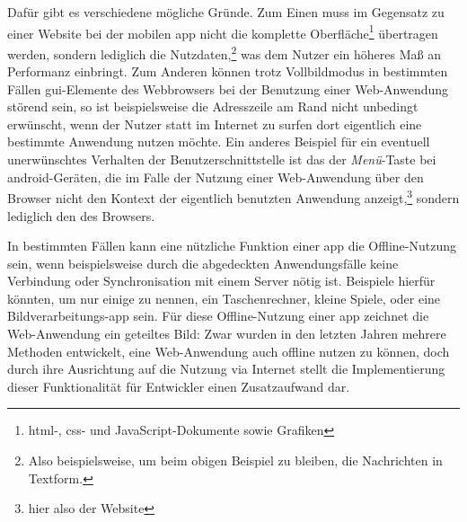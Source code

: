 Dafür gibt es verschiedene mögliche Gründe. Zum Einen muss im Gegensatz zu einer Website bei der mobilen \gls{app} nicht die komplette Oberfläche\footnote{\gls{html}-, \gls{css}- und JavaScript-Dokumente sowie Grafiken} übertragen werden, sondern lediglich die Nutzdaten,\footnote{Also beispielsweise, um beim obigen Beispiel zu bleiben, die Nachrichten in Textform.} was dem Nutzer ein höheres Maß an Performanz einbringt.
Zum Anderen können trotz Vollbildmodus in bestimmten Fällen \gls{gui}-Elemente des Webbrowsers bei der Benutzung einer Web-Anwendung störend sein, so ist beispielsweise die Adresszeile am Rand nicht unbedingt erwünscht, wenn der Nutzer statt im Internet zu surfen dort eigentlich eine bestimmte Anwendung nutzen möchte. 
Ein anderes Beispiel für ein eventuell unerwünschtes Verhalten der Benutzerschnittstelle ist das der \emph{Menü}-Taste bei \gls{android}-Geräten, die im Falle der Nutzung einer Web-Anwendung über den Browser nicht den Kontext der eigentlich benutzten Anwendung anzeigt,\footnote{hier also der Website} sondern lediglich den des Browsers.

In bestimmten Fällen kann eine nützliche Funktion einer \gls{app} die Offline-Nutzung sein, wenn beispielsweise durch die abgedeckten Anwendungsfälle keine Verbindung oder Synchronisation mit einem Server nötig ist. Beispiele hierfür könnten, um nur einige zu nennen, ein Taschenrechner, kleine Spiele, oder eine Bildverarbeitungs-\gls{app} sein. 
Für diese Offline-Nutzung einer \gls{app} zeichnet die Web-Anwendung ein geteiltes Bild: Zwar wurden in den letzten Jahren mehrere Methoden entwickelt, eine Web-Anwendung auch offline nutzen zu können, doch durch ihre Ausrichtung auf die Nutzung via Internet stellt die Implementierung dieser Funktionalität für Entwickler einen Zusatzaufwand dar. 

